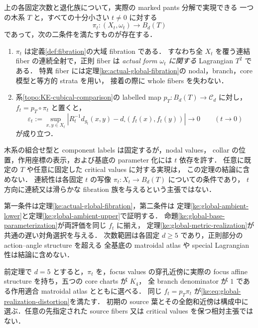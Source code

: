 \begin{theorem}
\label{ke:global-realization}
上の各固定次数と退化族について，実際の marked pants 分解で実現できる
一つの木系 $T$ と，すべての十分小さい $t\ne0$ に対する
\[
 \pi_t:(X_t,\omega_t)\longrightarrow B_d(T)
\]
であって，次の二条件を満たすものが存在する．
\begin{enumerate}
\item $\pi_t$ は定義\ref{def:fibration}の大域 fibration である．
すなわち全 $X_t$ を覆う連結 fiber の連続全射で，正則 fiber は
\emph{actual form $\omega_t$ に関する} Lagrangian $T^2$ である．
特異 fiber には定理\ref{ke:actual-global-fibration}の nodal，branch，core 模型と等方的 strata を用い，
接着の際に whole fibers を失わない．
\item 系\ref{topo:KE-cubical-comparison}の labelled map
$p_T:B_d(T)\to\mathcal C_d$ に対し，$f_t=p_T\circ\pi_t$ と置くと，
\begin{equation}\label{ke:eq:global-realization-distortion}
 \varepsilon_t:=
 \sup_{x,y\in X_t}
 \left|R_t^{-1}d_{g_t}(x,y)
              -d_\square(f_t(x),f_t(y))\right|
 \longrightarrow0
 \qquad(t\longrightarrow0)
\end{equation}
が成り立つ．
\end{enumerate}
木系の組合せ型と component labels は固定するが，nodal values，
collar の位置，作用座標の表示，および基底の parameter 化には $t$ 依存を許す．
任意に既定の $T$ や任意に固定した critical values に対する実現は，
この定理の結論に含めない．
連続性は各固定 $t$ の写像 $\pi_t:X_t\to B_d(T)$ についての条件であり，
$t$ 方向に連続又は滑らかな fibration 族を与えるという主張ではない．
\end{theorem}

第一条件は定理\ref{ke:actual-global-fibration}，第二条件は
定理\ref{ke:global-ambient-lower}と定理\ref{ke:global-ambient-upper}で証明する．
命題\ref{ke:global-base-parameterization}が両評価を同じ $f_t$ に揃え，
定理\ref{ke:global-metric-realization}が共通の遅い対角選択を与える．
次数範囲は各固定 $d\ge5$ であり，正則部分の action--angle structure を超える
全基底の matroidal atlas や special Lagrangian 性は結論に含めない．

\begin{corollary}
\label{ke:quintic-simultaneous-main}
前定理で $d=5$ とすると，$\pi_t$ を，focus values の穿孔近傍に実際の
focus affine structure を持ち，五つの core charts が $K_4$，
全 branch denominator が $1$ である作用適合 matroidal atlas とともに選べる．
同じ $f_t=p_T\pi_t$ が\eqref{ke:eq:global-realization-distortion}を満たす．
初期の source 葉とその全飽和近傍は構成中に選ぶ．任意の先指定された
source fibers 又は critical values を保つ相対主張ではない．
\end{corollary}

